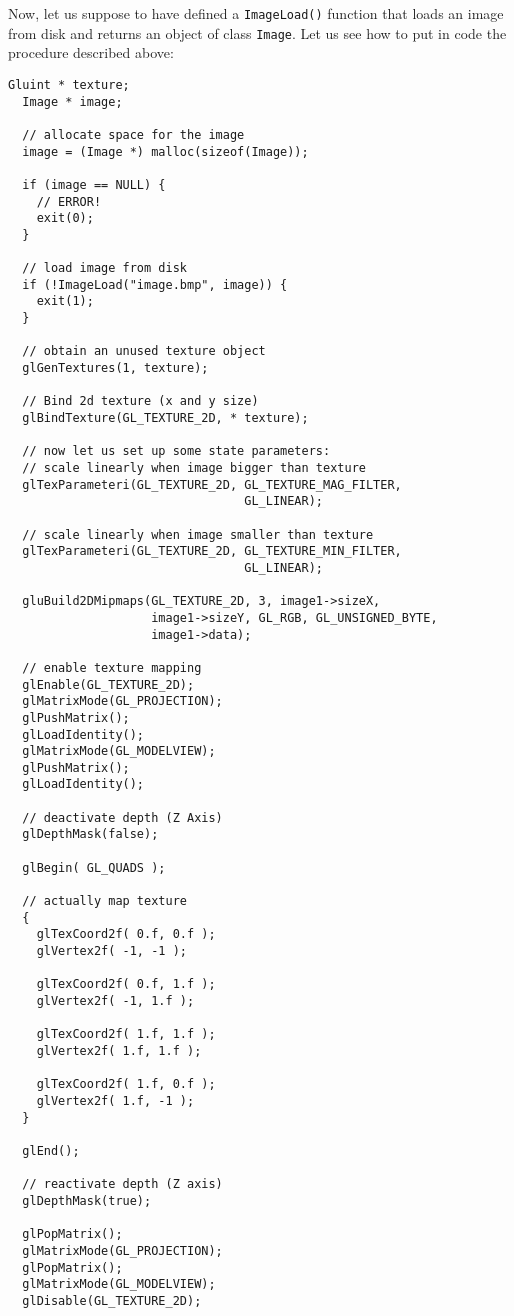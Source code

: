 Now, let us suppose to have defined a \texttt{ImageLoad()} function 
that loads an image from disk and returns an object of class \texttt{Image}. 
Let us see how to put in code the procedure described above:

\begin{lstlisting}[caption={Texture example}, label={code:texturemapping}, frame=trBL]
  Gluint * texture;
  Image * image;
    
  // allocate space for the image
  image = (Image *) malloc(sizeof(Image));

  if (image == NULL) {
    // ERROR!
    exit(0);
  }

  // load image from disk
  if (!ImageLoad("image.bmp", image)) {
    exit(1);
  }        

  // obtain an unused texture object
  glGenTextures(1, texture);

  // Bind 2d texture (x and y size)
  glBindTexture(GL_TEXTURE_2D, * texture);   

  // now let us set up some state parameters:
  // scale linearly when image bigger than texture
  glTexParameteri(GL_TEXTURE_2D, GL_TEXTURE_MAG_FILTER,
                                 GL_LINEAR);
 
  // scale linearly when image smaller than texture
  glTexParameteri(GL_TEXTURE_2D, GL_TEXTURE_MIN_FILTER,
                                 GL_LINEAR); 

  gluBuild2DMipmaps(GL_TEXTURE_2D, 3, image1->sizeX, 
                    image1->sizeY, GL_RGB, GL_UNSIGNED_BYTE, 
                    image1->data);

  // enable texture mapping
  glEnable(GL_TEXTURE_2D);
  glMatrixMode(GL_PROJECTION);
  glPushMatrix();
  glLoadIdentity();
  glMatrixMode(GL_MODELVIEW);
  glPushMatrix();
  glLoadIdentity();

  // deactivate depth (Z Axis)
  glDepthMask(false);

  glBegin( GL_QUADS );

  // actually map texture
  {
    glTexCoord2f( 0.f, 0.f );
    glVertex2f( -1, -1 );

    glTexCoord2f( 0.f, 1.f );
    glVertex2f( -1, 1.f );

    glTexCoord2f( 1.f, 1.f );
    glVertex2f( 1.f, 1.f );

    glTexCoord2f( 1.f, 0.f );
    glVertex2f( 1.f, -1 );
  }

  glEnd();

  // reactivate depth (Z axis)
  glDepthMask(true);

  glPopMatrix();
  glMatrixMode(GL_PROJECTION);
  glPopMatrix();
  glMatrixMode(GL_MODELVIEW);
  glDisable(GL_TEXTURE_2D);
\end{lstlisting}
